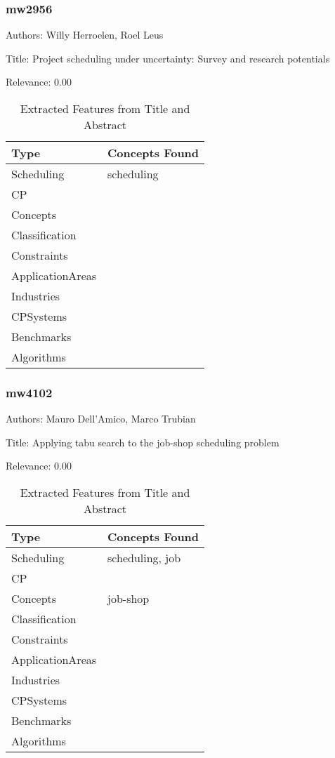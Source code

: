 \subsubsection{mw2956}
\label{mw:mw2956}

Authors: Willy Herroelen, Roel Leus

Title: Project scheduling under uncertainty: Survey and research potentials

Relevance:  0.00

{\scriptsize
\begin{longtable}{p{2cm}p{20cm}}
\caption{Extracted Features from Title and Abstract}\\ \toprule
Type & Concepts Found\\ \midrule
\endhead
\bottomrule
\endfoot
Scheduling & scheduling\\ 
CP & \\ 
Concepts & \\ 
Classification & \\ 
Constraints & \\ 
ApplicationAreas & \\ 
Industries & \\ 
CPSystems & \\ 
Benchmarks & \\ 
Algorithms & \\ 
\end{longtable}
}



\subsubsection{mw4102}
\label{mw:mw4102}

Authors: Mauro Dell'Amico, Marco Trubian

Title: Applying tabu search to the job-shop scheduling problem

Relevance:  0.00

{\scriptsize
\begin{longtable}{p{2cm}p{20cm}}
\caption{Extracted Features from Title and Abstract}\\ \toprule
Type & Concepts Found\\ \midrule
\endhead
\bottomrule
\endfoot
Scheduling & scheduling, job\\ 
CP & \\ 
Concepts & job-shop\\ 
Classification & \\ 
Constraints & \\ 
ApplicationAreas & \\ 
Industries & \\ 
CPSystems & \\ 
Benchmarks & \\ 
Algorithms & \\ 
\end{longtable}
}



